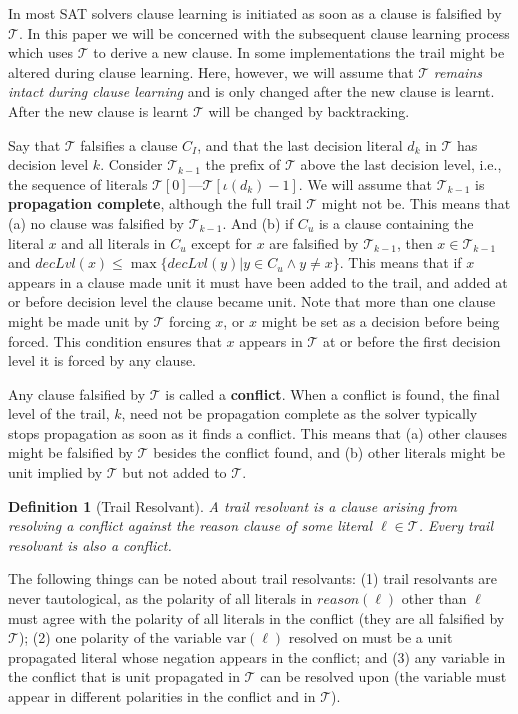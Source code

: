 \documentclass[runningheads]{llncs}
\newcommand{\sat}{SAT\xspace}
\newcommand{\trail}{\ensuremath{\mathcal{T}}}
\newcommand{\trailIdx}[1]{\ensuremath{\iota(#1)}}
\newcommand{\dlevel}[1]{\ensuremath{\mathit{decLvl}(#1)}}
\newcommand{\var}{\text{var}}
\newcommand{\reason}[1]{\ensuremath{\mathit{reason}(#1)}}
\newtheorem{defn}{Definition}
\begin{document}
In most \sat solvers clause learning is initiated as soon as a clause
is falsified by $\trail$. In this paper we will be concerned with the
subsequent clause learning process which uses $\trail$ to derive a new
clause. In some implementations the trail might be altered during
clause learning. Here, however, we will assume that $\trail$
\emph{remains intact during clause learning} and is only changed after
the new clause is learnt. After the new clause is learnt $\trail$
will be changed by backtracking.

Say that $\trail$ falsifies a clause $C_I$, and that the last decision
literal $d_k$ in $\trail$ has decision level $k$. Consider
$\trail_{k-1}$ the prefix of $\trail$ above the last decision level,
i.e., the sequence of literals
$\trail[0]$---$\trail[\trailIdx{d_k}-1]$. We will assume that
$\trail_{k-1}$ is \textbf{propagation complete}, although the full
trail $\trail$ might not be. This means that (a) no clause was
falsified by $\trail_{k-1}$. And (b) if $C_u$ is a clause containing
the literal $x$ and all literals in $C_u$ except for $x$ are falsified
by $\trail_{k-1}$, then $x\in \trail_{k-1}$ and
$\dlevel{x} \leq\max\{\dlevel{y} | y\in C_u \land y\neq x\}$. This
means that if $x$ appears in a clause made unit it must have been
added to the trail, and added at or before decision level the clause
became unit. Note that more than one clause might be made unit by
$\trail$ forcing $x$, or $x$ might be set as a decision before being
forced. This condition ensures that $x$ appears in $\trail$ at or
before the first decision level it is forced by any clause.

Any clause falsified by $\trail$ is called a \textbf{conflict}. When a
conflict is found, the final level of the trail, $k$, need not be
propagation complete as the solver typically stops propagation as soon
as it finds a conflict. This means that (a) other clauses might be
falsified by $\trail$ besides the conflict found, and (b) other
literals might be unit implied by $\trail$ but not added to $\trail$.

\begin{defn}[Trail Resolvant]
    A trail resolvant is a clause arising from resolving a conflict
    against the reason clause of some literal $\ell \in \trail$. Every
    trail resolvant is also a conflict.
\end{defn}

The following things can be noted about trail resolvants: (1) trail
resolvants are never tautological, as the polarity of all literals in
$\reason{\ell}$ other than $\ell$ must agree with the polarity of all
literals in the conflict (they are all falsified by $\trail$); (2) one
polarity of the variable $\var(\ell)$ resolved on must be a unit
propagated literal whose negation appears in the conflict; and (3) any
variable in the conflict that is unit propagated in $\trail$ can be
resolved upon (the variable must appear in different polarities in the
conflict and in $\trail$).
\end{document}
